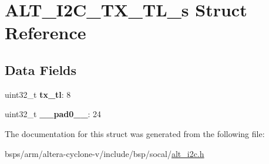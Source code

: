 \hypertarget{structALT__I2C__TX__TL__s}{}\section{A\+L\+T\+\_\+\+I2\+C\+\_\+\+T\+X\+\_\+\+T\+L\+\_\+s Struct Reference}
\label{structALT__I2C__TX__TL__s}
\subsection*{Data Fields}
\begin{DoxyCompactItemize}
\item 
\mbox{\label{structALT__I2C__TX__TL__s_a4d079f338d1c2f127e2e7f72f4c6e58c}} 
uint32\+\_\+t {\bfseries tx\+\_\+tl}\+: 8
\item 
\mbox{\label{structALT__I2C__TX__TL__s_aa2661774081d5dac9b6f5d625e10433a}} 
uint32\+\_\+t {\bfseries \+\_\+\+\_\+pad0\+\_\+\+\_\+}\+: 24
\end{DoxyCompactItemize}


The documentation for this struct was generated from the following file\+:\begin{DoxyCompactItemize}
\item 
bsps/arm/altera-\/cyclone-\/v/include/bsp/socal/\mbox{\hyperlink{socal_2alt__i2c_8h}{alt\+\_\+i2c.\+h}}\end{DoxyCompactItemize}
